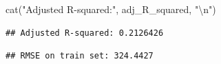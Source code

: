 \documentclass[
]{article}
\newenvironment{Shaded}{\begin{snugshade}}{\end{snugshade}}
\newcommand{\CommentTok}[1]{\textcolor[rgb]{0.56,0.35,0.01}{\textit{#1}}}
\newcommand{\DecValTok}[1]{\textcolor[rgb]{0.00,0.00,0.81}{#1}}
\newcommand{\FunctionTok}[1]{\textcolor[rgb]{0.00,0.00,0.00}{#1}}
\newcommand{\NormalTok}[1]{#1}
\newcommand{\OtherTok}[1]{\textcolor[rgb]{0.56,0.35,0.01}{#1}}
\newcommand{\SpecialCharTok}[1]{\textcolor[rgb]{0.00,0.00,0.00}{#1}}
\newcommand{\StringTok}[1]{\textcolor[rgb]{0.31,0.60,0.02}{#1}}
\begin{document}
\begin{Shaded}
\begin{Highlighting}[]
\FunctionTok{cat}\NormalTok{(}\StringTok{"Adjusted R{-}squared:"}\NormalTok{, adj\_R\_squared, }\StringTok{"}\SpecialCharTok{\textbackslash{}n}\StringTok{"}\NormalTok{)}
\end{Highlighting}
\end{Shaded}

\begin{verbatim}
## Adjusted R-squared: 0.2126426
\end{verbatim}

\begin{Shaded}
\end{Shaded}

\begin{verbatim}
## RMSE on train set: 324.4427
\end{verbatim}
\end{document}
